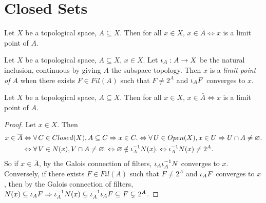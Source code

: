 \documentclass[main.tex]{subfiles}
\begin{document}
\section{Closed Sets}

\begin{rmk} 
  
  Let $X$ be a topological space, $A \subseteq X$.
  Then for all $x \in X$,
  $x \in \bar{A} \iff x$ is a limit point of $A$.
\end{rmk}

\begin{dfn} 

  Let $X$ be a topological space, $A \subseteq X$, $x \in X$.
  Let $\iota_A : A \to X$ be the natural inclusion,
  continuous by giving $A$ the subspace topology. 
  Then $x$ is a \emph{limit point of $A$} when
  there exists $F \in Fil(A)$ such that 
  $F \neq 2^A$ and $\iota_A F$ converges to $x$.

\end{dfn}

\begin{thm} 
  
  Let $X$ be a topological space, $A \subseteq X$.
  Then for all $x \in X$,
  $x \in \bar{A} \iff x$ is a limit point of $A$.
\end{thm}
\begin{proof}
  Let $x \in X$.
  Then \begin{align*}
    x \in \overline{A} 
    &\Leftrightarrow \forall\, C \in Closed(X), A \subseteq C \Rightarrow x \in C. 
    \Leftrightarrow \forall\, U \in Open(X), x \in U \Rightarrow U \cap A \neq \varnothing. \\
    &\Leftrightarrow \forall\, V \in N(x), V \cap A \neq \varnothing. 
    \Leftrightarrow \varnothing \notin \iota_A^{-1}N(x). 
    \Leftrightarrow \iota_A^{-1} N(x) \neq 2^A.
  \end{align*}
  So if $x \in \bar{A}$, by the Galois connection of filters,
  $\iota_A\iota_A^{-1}N$ converges to $x$.
  Conversely, if there exists $F\in Fil(A)$ such that 
  $F \neq 2^A$ and $\iota_A F$ converges to $x$,
  then by the Galois connection of filters, 
  $N(x) \subseteq \iota_A F \Rightarrow 
  \iota_A^{-1} N(x) \subseteq \iota_A^{-1}\iota_A F \subseteq F \subsetneq 2^A$. 
\end{proof}
\end{document}

